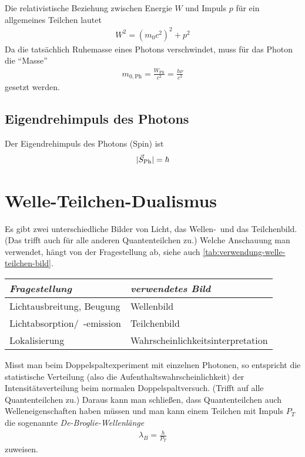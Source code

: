 Die relativistische Beziehung zwischen Energie $W$ und Impuls $p$ für ein
allgemeines Teilchen lautet
\begin{gather*}
  W^2 = (m_0c^2)^2 + p^2
\end{gather*}
Da die tatsächlich Ruhemasse eines Photons verschwindet, muss für das
Photon die \enquote{Masse}
\begin{gather*}
  m_{0,\text{Ph}}= \frac{W_\text{Ph}}{c^2} = \frac{h\nu}{c^2}
\end{gather*}
gesetzt werden.


\subsection{Eigendrehimpuls des Photons}
Der Eigendrehimpuls des Photons (Spin) ist
\begin{gather*}
  |\vec{S}_\text{Ph}| = \hbar
\end{gather*}


\section{Welle-Teilchen-Dualismus}
Es gibt zwei unterschiedliche Bilder von Licht, das Wellen-~und das
Teilchenbild. (Das trifft auch für alle anderen Quantenteilchen zu.)
Welche Anschauung man verwendet, hängt von der Fragestellung ab, siehe
auch \autoref{tab:verwendung-welle-teilchen-bild}.
\begin{table}[tbh]
  \centering
  \begin{tabular}{ll}
    \toprule
    \emph{Fragestellung} & \emph{verwendetes Bild}\\\midrule[\heavyrulewidth]
    Lichtausbreitung, Beugung & Wellenbild \\\midrule
    Lichtabsorption/~-emission & Teilchenbild \\\midrule
    Lokalisierung & Wahrscheinlichkeitsinterpretation\\\bottomrule
  \end{tabular}
\end{table}

Misst man beim Doppelspaltexperiment mit einzelnen Photonen, so
entspricht die statistische Verteilung (also die
Aufenthaltswahrscheinlichkeit) der Intensitätsverteilung beim
normalen Doppelspaltversuch. (Trifft auf alle Quantenteilchen zu.)
Daraus kann man schließen, dass Quantenteilchen auch
Welleneigenschaften haben müssen und man kann einem Teilchen mit
Impuls $P_T$ die sogenannte 
\emph{De-Broglie-Wellenlänge}
\begin{gather*}
  \lambda_B=\frac{h}{P_T}
\end{gather*}%
%
zuweisen.

